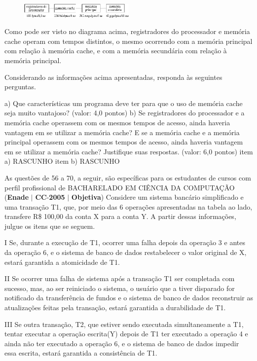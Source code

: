 \documentclass{exam}
\begin{document}
\begin{questions}
\begin{figure}[H]
	\begin{center}
		\includegraphics[width=0.5\textwidth]{CIENCIA_DA_COMPUTACAO_Prova2005-utf8_figuras/fig-0019.jpg}
	\end{center}
\end{figure}

Como pode ser visto no diagrama acima, registradores do processador e memória cache operam com tempos distintos, o
mesmo ocorrendo com a memória principal com relação à memória cache, e com a memória secundária com relação à memória
principal.

Considerando as informações acima apresentadas, responda às seguintes perguntas.

a) Que características um programa deve ter para que o uso de memória cache seja muito vantajoso? (valor: 4,0 pontos)
b) Se registradores do processador e a memória cache operassem com os mesmos tempos de acesso, ainda haveria vantagem em se
utilizar a memória cache? E se a memória cache e a memória principal operassem com os mesmos tempos de acesso, ainda haveria
vantagem em se utilizar a memória cache? Justifique suas respostas. (valor: 6,0 pontos)
item a) RASCUNHO
item b) RASCUNHO

As questões de 56 a 70, a seguir, são específicas para os estudantes de cursos com perfil profissional de
BACHARELADO EM CIÊNCIA DA COMPUTAÇÃO
\question (\textbf{Enade} $|$ \textbf{CC}-\textbf{2005} $|$ \textbf{Objetiva})
Considere um sistema bancário
simplificado e uma transação T1,
que, por meio das 6 operações
apresentadas na tabela ao lado,
transfere R\$ 100,00 da conta X
para a conta Y. A partir dessas
informações, julgue os itens que se
seguem.

I Se, durante a execução de T1,
ocorrer uma falha depois da
operação 3 e antes da operação
6, e o sistema de banco de dados
restabelecer o valor original
de X, estará garantida a atomicidade de T1. 

II Se ocorrer uma falha de sistema após a transação T1 ser
completada com sucesso, mas, ao ser reiniciado o sistema, o
usuário que a tiver disparado for notificado da transferência
de fundos e o sistema de banco de dados reconstruir as
atualizações feitas pela transação, estará garantida a
durabilidade de T1. 

III Se outra transação, T2, que estiver sendo executada
simultaneamente a T1, tentar executar a operação
escrita(Y) depois de T1 ter executado a operação 4 e
ainda não ter executado a operação 6, e o sistema de banco
de dados impedir essa escrita, estará garantida a consistência
de T1.


\end{questions}
\end{document}
